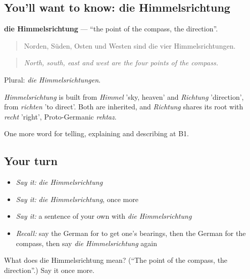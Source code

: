 \subsection*{You'll want to know: die Himmelsrichtung}
\textbf{die Himmelsrichtung} — \textquotedblleft{}the point of the compass, the direction\textquotedblright{}.

\begin{quote}
Norden, Süden, Osten und Westen sind die vier Himmelsrichtungen.
\end{quote}

\begin{quote}
\emph{North, south, east and west are the four points of the compass.}
\end{quote}

Plural: \emph{die Himmelsrichtungen}.

\begin{cousinweb}
\emph{Himmelsrichtung} is built from \emph{Himmel} 'sky, heaven' and \emph{Richtung} 'direction', from \emph{richten} 'to direct'. Both are inherited, and \emph{Richtung} shares its root with \emph{recht} 'right', Proto-Germanic \emph{rehtaz}.
\end{cousinweb}

\begin{grammarlens}[title={What you've built}]
One more word for telling, explaining and describing at B1.
\end{grammarlens}

\subsection*{Your turn}
\begin{itemize}
\raggedright
  \item \emph{Say it:} \emph{die Himmelsrichtung}
  \item \emph{Say it:} \emph{die Himmelsrichtung}, once more
  \item \emph{Say it:} a sentence of your own with \emph{die Himmelsrichtung}
  \item \emph{Recall:} say the German for to get one's bearings, then the German for the compass, then say \emph{die Himmelsrichtung} again
\end{itemize}

\begin{tcolorbox}[breakable,colback=teal!4,colframe=teal!35!black,title={Before you move on}]
What does die Himmelsrichtung mean? (\textquotedblleft{}The point of the compass, the direction\textquotedblright{}.) Say it once more.
\end{tcolorbox}
